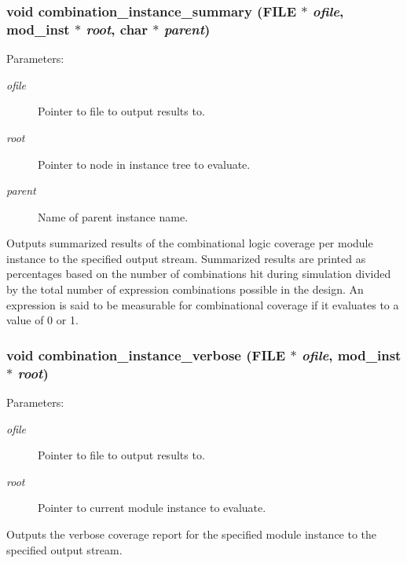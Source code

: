\subsubsection{\setlength{\rightskip}{0pt plus 5cm}void combination\_\-instance\_\-summary (FILE $\ast$ {\em ofile}, {\bf mod\_\-inst} $\ast$ {\em root}, char $\ast$ {\em parent})}\label{comb_8c_a3}


\begin{Desc}
\item[Parameters: ]\par
\begin{description}
\item[{\em 
ofile}]Pointer to file to output results to. \item[{\em 
root}]Pointer to node in instance tree to evaluate. \item[{\em 
parent}]Name of parent instance name.\end{description}
\end{Desc}
Outputs summarized results of the combinational logic coverage per module instance to the specified output stream. Summarized results are printed  as percentages based on the number of combinations hit during simulation  divided by the total number of expression combinations possible in the  design. An expression is said to be measurable for combinational coverage  if it evaluates to a value of 0 or 1. 
\subsubsection{\setlength{\rightskip}{0pt plus 5cm}void combination\_\-instance\_\-verbose (FILE $\ast$ {\em ofile}, {\bf mod\_\-inst} $\ast$ {\em root})}\label{comb_8c_a9}


\begin{Desc}
\item[Parameters: ]\par
\begin{description}
\item[{\em 
ofile}]Pointer to file to output results to. \item[{\em 
root}]Pointer to current module instance to evaluate.\end{description}
\end{Desc}
Outputs the verbose coverage report for the specified module instance to the specified output stream. 

